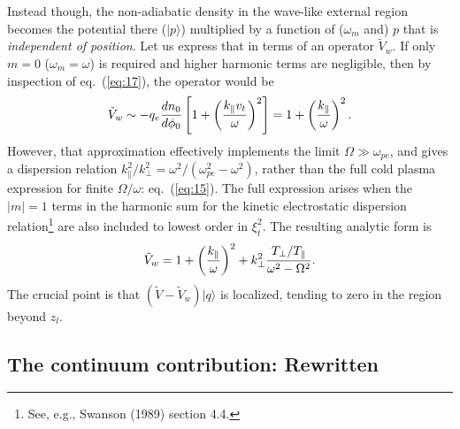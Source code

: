 \documentclass[12pt]{article}
\def\ket#1{|#1\rangle}
\begin{document}
Instead though, the non-adiabatic density in the wave-like external region
becomes the potential there ($\ket{p}$) multiplied by a function of
($\omega_m$ and) $p$ that is \emph{independent of position}. Let us
express that in terms of an operator $\tilde{V}_{w}$. If only $m=0$
($\omega_m=\omega$) is
required and higher harmonic terms are negligible, then by inspection
of eq.\ (\ref{eq:17}), the operator
would be 
\begin{equation}
  \label{eq:20}
\tilde{V}_{w}\sim-q_e{dn_0\over d\phi_0}\left[1+\left(k_\parallel v_t\over\omega\right)^2\right]=1+\left(k_\parallel\over\omega\right)^2.
\end{equation}
However, that approximation effectively implements the limit
$\Omega\gg \omega_{pe}$, and gives a dispersion relation
$k_\parallel^2/k_\perp^2 = \omega^2/(\omega_{pe}^2-\omega^2)$, rather
than the full cold plasma expression for finite $\Omega/\omega$: eq.\
(\ref{eq:15}). The full expression arises when the $|m|=1$ terms in
the harmonic sum for the kinetic electrostatic dispersion
relation\footnote{See, e.g., Swanson (1989) section 4.4.} are also
included to lowest order in $\xi_t^2$. The resulting analytic form is
\begin{equation}
  \label{eq:24}
  \tilde V_w= 1 + \left(k_\parallel\over\omega\right)^2 +
  k_\perp^2 {T_\perp/T_\parallel\over\omega^2-\Omega^2}.
\end{equation}
The crucial point is that $(\tilde{V}-\tilde{V}_{w})\ket{q}$ is
localized, tending to zero in the region beyond $z_l$.

\subsection{The continuum contribution: Rewritten}
\end{document}
